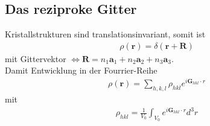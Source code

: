 \subsection{Das reziproke Gitter} \label{kap:3_2}
Kristallstrukturen sind translationsinvariant, somit ist
\begin{align*}
    \rho(\textbf{r}) = \delta(\textbf{r}+\textbf{R})
\end{align*}
mit Gittervektor $\Leftrightarrow \textbf{R} = n_1 \textbf{a}_1 + n_2 \textbf{a}_2 + n_3 \textbf{a}_3$.\\
Damit Entwicklung in der Fourrier-Reihe
\begin{align*}
    \rho(\textbf{r}) = \sum_{h,k,l}\rho_{hkl} e^{i \textbf{G}_{hkl}\cdot r}
\end{align*}
mit
\begin{align*}
    \rho_{hkl} = \frac{1}{V_0}\int_{V_0}e^{i \textbf{G}_{hkl}\cdot r}d^3r
\end{align*}

